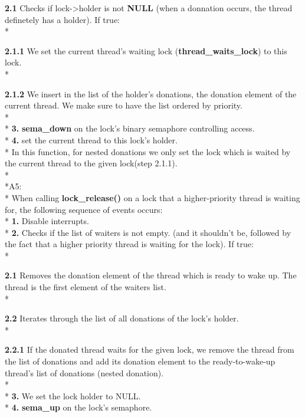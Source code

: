 \documentclass{article}
\begin{document}
     \textbf{2.1}  Checks if lock-\textgreater holder is not \textbf{NULL} (when a donnation occurs, the thread definetely has a holder). If true:
\\*


      \textbf{2.1.1} We set the current thread's waiting lock (\textbf{thread\_waits\_lock}) to this lock.
\\*



      \textbf{2.1.2} We insert in the list of the holder's donations, the donation element of the current thread. We make sure to have the list ordered by priority.
\\*
\\*  \textbf{3.} \textbf{sema\_down} on the lock's binary semaphore controlling access.
\\*
  \textbf{4.} set the current thread to this lock's holder.
\\*
  In this function, for nested donations we only set the lock which is waited by the current thread to the given lock(step 2.1.1).
\\*\\*A5:\\*
When calling \textbf{lock\_release()} on a lock that a higher-priority thread is waiting for, the following sequence of events occurs:\\*
      \textbf{1.} Disable interrupts.
\\*
      \textbf{2.} Checks if the list of waiters is not empty. (and it shouldn't be, followed by the fact that a higher priority thread is waiting for the lock). If true:
\\*

          \textbf{2.1} Removes the donation element of the thread which is ready to wake up. The thread is the first element of the waiters list.
\\*

           \textbf{2.2} Iterates through the list of all donations of the lock's holder.
\\*


            \textbf{2.2.1} If the donated thread waits for the given lock, we remove the thread from the list of donations and add its donation element to the ready-to-wake-up thread's list of donations (nested donation).
\\*
\\* \textbf{3.} We set the lock holder to NULL.
\\*
      \textbf{4.} \textbf{sema\_up} on the lock's semaphore.
\end{document}

